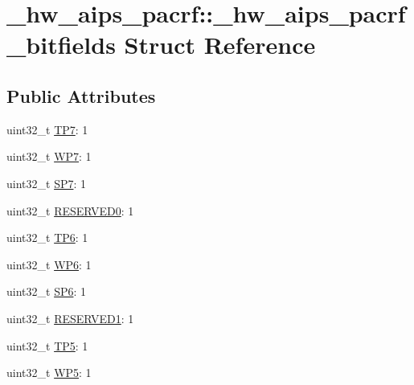 \hypertarget{struct__hw__aips__pacrf_1_1__hw__aips__pacrf__bitfields}{}\section{\+\_\+hw\+\_\+aips\+\_\+pacrf\+:\+:\+\_\+hw\+\_\+aips\+\_\+pacrf\+\_\+bitfields Struct Reference}
\label{struct__hw__aips__pacrf_1_1__hw__aips__pacrf__bitfields}
\subsection*{Public Attributes}
\begin{DoxyCompactItemize}
\item 
uint32\+\_\+t \hyperlink{struct__hw__aips__pacrf_1_1__hw__aips__pacrf__bitfields_a47cb387230d68fb4e9cd02d81affe026}{T\+P7}\+: 1
\item 
uint32\+\_\+t \hyperlink{struct__hw__aips__pacrf_1_1__hw__aips__pacrf__bitfields_a12d723740340c5c99d585a01b0592095}{W\+P7}\+: 1
\item 
uint32\+\_\+t \hyperlink{struct__hw__aips__pacrf_1_1__hw__aips__pacrf__bitfields_a267d454cb09704d5046612ae78080a90}{S\+P7}\+: 1
\item 
uint32\+\_\+t \hyperlink{struct__hw__aips__pacrf_1_1__hw__aips__pacrf__bitfields_a80a3674d6c99ebf2a2c918364d848f6a}{R\+E\+S\+E\+R\+V\+E\+D0}\+: 1
\item 
uint32\+\_\+t \hyperlink{struct__hw__aips__pacrf_1_1__hw__aips__pacrf__bitfields_a506334a981b4f09ee5c7d0f5f6681d18}{T\+P6}\+: 1
\item 
uint32\+\_\+t \hyperlink{struct__hw__aips__pacrf_1_1__hw__aips__pacrf__bitfields_a19b92b5d441733fdeb36f6608522c667}{W\+P6}\+: 1
\item 
uint32\+\_\+t \hyperlink{struct__hw__aips__pacrf_1_1__hw__aips__pacrf__bitfields_a64661aaaa8f2f9cff58a7a1a227f4739}{S\+P6}\+: 1
\item 
uint32\+\_\+t \hyperlink{struct__hw__aips__pacrf_1_1__hw__aips__pacrf__bitfields_aac96960c5f68531f517875bfd0ba0140}{R\+E\+S\+E\+R\+V\+E\+D1}\+: 1
\item 
uint32\+\_\+t \hyperlink{struct__hw__aips__pacrf_1_1__hw__aips__pacrf__bitfields_aa7f9779712ac023e796b5a81eee5eed5}{T\+P5}\+: 1
\item 
uint32\+\_\+t \hyperlink{struct__hw__aips__pacrf_1_1__hw__aips__pacrf__bitfields_a37080187c584c1ad53525118480bb6c8}{W\+P5}\+: 1

\end{DoxyCompactItemize}
